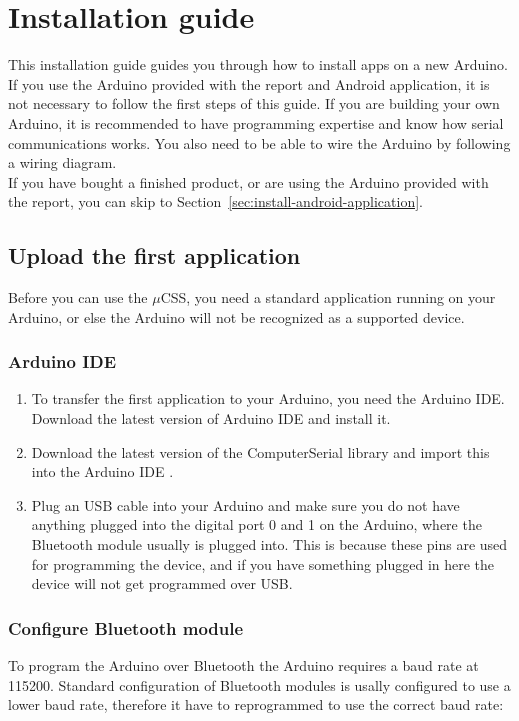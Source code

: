 \chapter{Installation guide}\label{installation-guide}

This installation guide guides you through how to install apps on a new Arduino. If you use the Arduino provided with the report and Android application, it is not necessary to follow the first steps of this guide. If you are building your own Arduino, it is recommended to have programming expertise and know how serial communications works. You also need to be able to wire the Arduino by following a wiring diagram. \\

If you have bought a finished product, or are using the Arduino provided with the report, you can skip to Section~\ref{sec:install-android-application}.

	\section{Upload the first application}
	Before you can use the $\mu$CSS, you need a standard application running on your Arduino, or else the Arduino will not be recognized as a supported device.
	
		\subsection{Arduino IDE}
		\begin{enumerate}
		\item To transfer the first application to your Arduino, you need the Arduino IDE. Download the latest version of Arduino IDE \cite{download-arduino} and install it.
	
		\item Download the latest version of the ComputerSerial library \cite{download-computerserial} and import this into the Arduino IDE \cite{import-libraries}.
	
		\item Plug an USB cable into your Arduino and make sure you do not have anything plugged into the digital port 0 and 1 on the Arduino, where the Bluetooth module usually is plugged into. This is because these pins are used for programming the device, and if you have something plugged in here the device will not get programmed over USB.
		\end{enumerate}
		
				
		\subsection{Configure Bluetooth module}
		To program the Arduino over Bluetooth the Arduino requires a baud rate at 115200. Standard configuration of Bluetooth modules is usally configured to use a lower baud rate, therefore it have to reprogrammed to use the correct baud rate:\\
		
